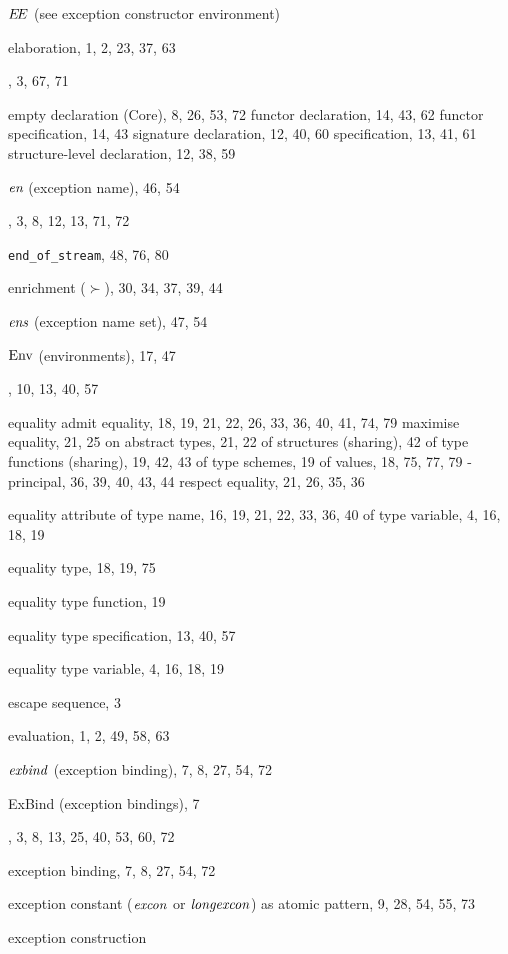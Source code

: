 \begin{theindex}
\item $\mbox{$E\!E$}$ (see exception constructor environment) 
\item elaboration, 1, 2, 23, 37, 63
\item \ELSE, 3, 67, 71
\item empty 
\subitem declaration (Core), 8, 26, 53, 72
\subitem functor declaration, 14, 43, 62
\subitem functor specification, 14, 43
\subitem signature declaration, 12, 40, 60
\subitem specification, 13, 41, 61
\subitem structure-level declaration, 12, 38, 59
\item $\mbox{\it en}$ (exception name), 46, 54
\item \END, 3, 8, 12, 13, 71, 72
\item \verb+end_of_stream+, 48, 76, 80
\item enrichment ($\succ$), 30, 34, 37, 39, 44
\item $\mbox{\it ens}$ (exception name set), 47, 54
\item ${\rm Env}$ (environments), 17, 47
\item \EQTYPE, 10, 13, 40, 57
\item equality 
\subitem admit equality, 18, 19, 21, 22, 26, 33, 36, 40, 41, 74, 79
\subitem maximise equality, 21, 25
\subitem on abstract types, 21, 22
\subitem of structures (sharing), 42
\subitem of type functions (sharing), 19, 42, 43
\subitem of type schemes, 19
\subitem of values, 18, 75, 77, 79
\subitem -principal, 36, 39, 40, 43, 44
\subitem respect equality, 21, 26, 35, 36
\item equality attribute 
\subitem of type name, 16, 19, 21, 22, 33, 36, 40
\subitem of type variable, 4, 16, 18, 19
\item equality type, 18, 19, 75
\item equality type function, 19
\item equality type specification, 13, 40, 57
\item equality type variable, 4, 16, 18, 19
\item escape sequence, 3
\item evaluation, 1, 2, 49, 58, 63
\item ${\it exbind}$ (exception binding), 7, 8, 27, 54, 72
\item ExBind (exception bindings), 7
\item \EXCEPTION, 3, 8, 13, 25, 40, 53, 60, 72
\item exception binding, 7, 8, 27, 54, 72
\item exception constant (${\it excon}$ or ${\it longexcon}$) 
\subitem as atomic pattern, 9, 28, 54, 55, 73
\item exception construction 

\end{theindex}

